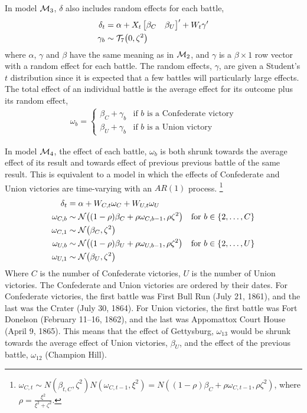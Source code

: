 In model $\mathcal{M}_{\text{3}}$, $\delta$ also includes random effects for each battle,
\begin{align}
  \label{bonds:eq:10}
  \delta_{t} &= \alpha + X_{t} \begin{bmatrix}\beta_{C} & \beta_{U}\end{bmatrix}' + W_{t} \gamma' \\
  \label{bonds:eq:12}
  \gamma_{b} &\sim \mathcal{T}_{7}\mathopen{}\left(0, \zeta^{2}\right)\mathclose{}
\end{align}
where $\alpha$, $\gamma$ and $\beta$ have the same meaning as in $\mathcal{M}_{\text{2}}$, and $\gamma$ is a $\beta \times 1$ row vector with a random effect for each battle.
The random effects, $\gamma$, are given a Student's $t$ distribution since it is expected that a few battles will particularly large effects.
The total effect of an individual battle is the average effect for its outcome plus its random effect,
\begin{align}
  \omega_{b} =
  \begin{cases}
    \beta_{C} + \gamma_{b} & \text{if $b$ is a Confederate victory} \\
    \beta_{U} + \gamma_{b} & \text{if $b$ is a Union victory}
  \end{cases}
\end{align}

In model $\mathcal{M}_{\text{4}}$, the effect of each battle, $\omega_{b}$ is both shrunk towards the average effect of its result and towards effect of previous previous battle of the same result.
This is equivalent to a model in which the effects of Confederate and Union victories are time-varying with an $AR(1)$ process.%
\footnote{
   $\omega_{C,t} \sim N(\beta_{t,C}, \zeta^{2}) N(\omega_{C,t-1}, \xi^{2}) = N((1 - \rho) \beta_{C} + \rho \omega_{C,t-1}, \rho \zeta^{2})$, where $\rho = \frac{\xi^{2}}{\xi^{2} + \zeta^{2}}$.
}
\begin{align}
  \label{bonds:eq:11}
  \delta_{t} &= \alpha + W_{C,t} \omega_{C} + W_{U,t} \omega_{U} \\
  \omega_{C,b} & \sim \mathcal{N}\mathopen{}\left((1 - \rho) \beta_{C} + \rho \omega_{C,b-1}, \rho \zeta^{2}\right)\mathclose{} & \text{for $b \in \{2, \dots, C\}$} \\
  \omega_{C,1} & \sim \mathcal{N}\mathopen{}\left( \beta_{C}, \zeta^{2}\right)\mathclose{} \\
  \omega_{U,b} & \sim \mathcal{N}\mathopen{}\left((1 - \rho) \beta_{U} + \rho \omega_{U,b-1}, \rho \zeta^{2}\right)\mathclose{} & \text{for $b \in \{2, \dots, U \}$} \\
  \omega_{U,1} & \sim \mathcal{N}\mathopen{}\left( \beta_{U}, \zeta^{2}\right)\mathclose{}
\end{align}
Where $C$ is the number of Confederate victories, $U$ is the number of Union victories.
The Confederate and Union victories are ordered by their dates.
For Confederate victories, the first battle was First Bull Run (July 21, 1861), and the last was the Crater (July 30, 1864).
For Union victories, the first battle was Fort Donelson (February 11--16, 1862), and the last was Appomattox Court House (April 9, 1865).
This means that the effect of Gettysburg, $\omega_{13}$ would be shrunk towards the average effect of Union victories, $\beta_{U}$, and the effect of the previous battle, $\omega_{12}$ (Champion Hill).%

